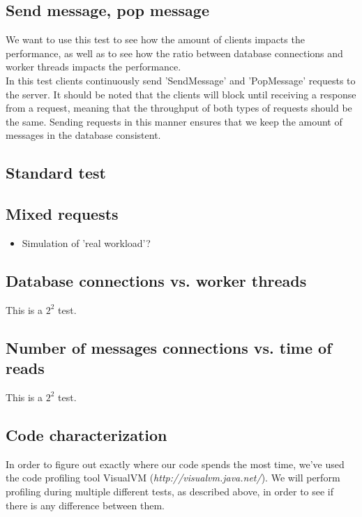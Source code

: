 \documentclass{article}
\begin{document}
        \subsection{Send message, pop message}
            We want to use this test to see how the amount of clients impacts the performance, as well as to see how the ratio between database connections and worker threads impacts the performance.\\
            In this test clients continuously send 'SendMessage' and 'PopMessage' requests to the server. It should be noted that the clients will block until receiving a response from a request, meaning that the throughput of both types of requests should be the same. Sending requests in this manner ensures that we keep the amount of messages in the database consistent.

        \subsection{Standard test}

        \subsection{Mixed requests}
            \begin{itemize}
                \item Simulation of 'real workload'?
            \end{itemize}

        \subsection{Database connections vs. worker threads}
            This is a $2^2$ test.

        \subsection{Number of messages connections vs. time of reads}
            This is a $2^2$ test.

        \subsection{Code characterization}
            In order to figure out exactly where our code spends the most time, we've used the code profiling tool VisualVM (\textit{http://visualvm.java.net/}). We will perform profiling during multiple different tests, as described above, in order to see if there is any difference between them.
\end{document}
